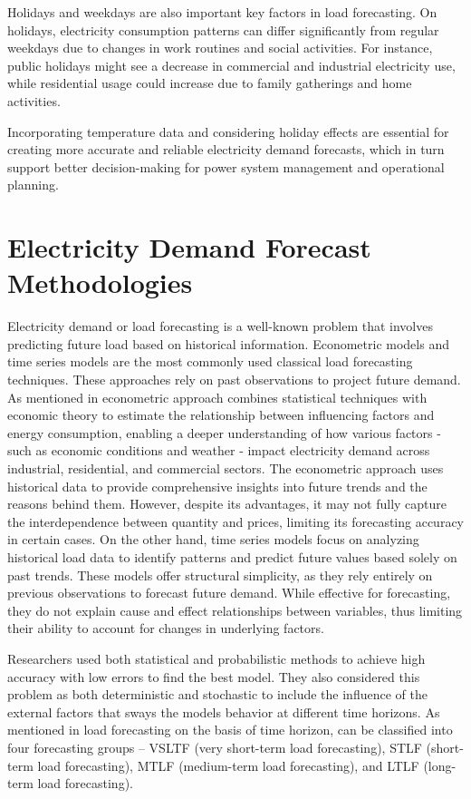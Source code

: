 \documentclass[mstat,12pt]{unswthesis}
\begin{document}
Holidays and weekdays are also important key factors in load
forecasting. On holidays, electricity consumption patterns can differ
significantly from regular weekdays due to changes in work routines and
social activities. For instance, public holidays might see a decrease in
commercial and industrial electricity use, while residential usage could
increase due to family gatherings and home activities.

Incorporating temperature data and considering holiday effects are
essential for creating more accurate and reliable electricity demand
forecasts, which in turn support better decision-making for power system
management and operational planning.

\section{Electricity Demand Forecast
Methodologies}\label{electricity-demand-forecast-methodologies}

Electricity demand or load forecasting is a well-known problem that
involves predicting future load based on historical information.
Econometric models and time series models are the most commonly used
classical load forecasting techniques. These approaches rely on past
observations to project future demand. As mentioned in \cite{9812604}
econometric approach combines statistical techniques with economic
theory to estimate the relationship between influencing factors and
energy consumption, enabling a deeper understanding of how various
factors - such as economic conditions and weather - impact electricity
demand across industrial, residential, and commercial sectors. The
econometric approach uses historical data to provide comprehensive
insights into future trends and the reasons behind them. However,
despite its advantages, it may not fully capture the interdependence
between quantity and prices, limiting its forecasting accuracy in
certain cases. On the other hand, time series models focus on analyzing
historical load data to identify patterns and predict future values
based solely on past trends. These models offer structural simplicity,
as they rely entirely on previous observations to forecast future
demand. While effective for forecasting, they do not explain cause and
effect relationships between variables, thus limiting their ability to
account for changes in underlying factors.

Researchers used both statistical and probabilistic methods to achieve
high accuracy with low errors to find the best model. They also
considered this problem as both deterministic and stochastic to include
the influence of the external factors that sways the models behavior at
different time horizons. As mentioned in \cite{9812604} load forecasting
on the basis of time horizon, can be classified into four forecasting
groups -- VSLTF (very short-term load forecasting), STLF (short-term
load forecasting), MTLF (medium-term load forecasting), and LTLF
(long-term load forecasting).
\end{document}
